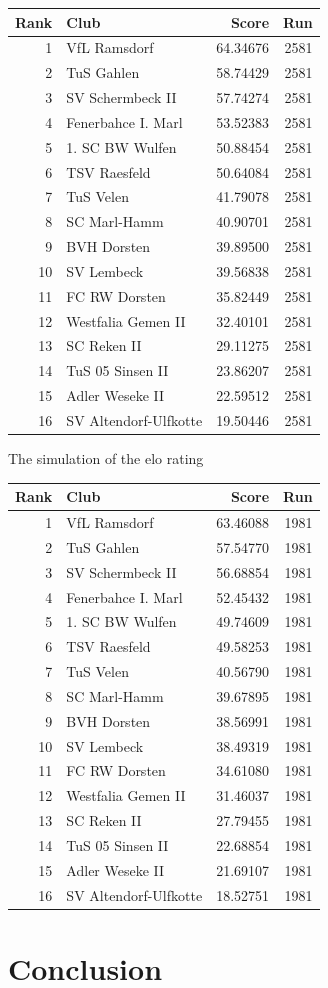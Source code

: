 \documentclass[12pt,a4paper]{article}
\begin{document}
\begin{longtable}[]{@{}rlrr@{}}
\toprule
Rank & Club & Score & Run\tabularnewline
\midrule
\endhead
1 & VfL Ramsdorf & 64.34676 & 2581\tabularnewline
2 & TuS Gahlen & 58.74429 & 2581\tabularnewline
3 & SV Schermbeck II & 57.74274 & 2581\tabularnewline
4 & Fenerbahce I. Marl & 53.52383 & 2581\tabularnewline
5 & 1. SC BW Wulfen & 50.88454 & 2581\tabularnewline
6 & TSV Raesfeld & 50.64084 & 2581\tabularnewline
7 & TuS Velen & 41.79078 & 2581\tabularnewline
8 & SC Marl-Hamm & 40.90701 & 2581\tabularnewline
9 & BVH Dorsten & 39.89500 & 2581\tabularnewline
10 & SV Lembeck & 39.56838 & 2581\tabularnewline
11 & FC RW Dorsten & 35.82449 & 2581\tabularnewline
12 & Westfalia Gemen II & 32.40101 & 2581\tabularnewline
13 & SC Reken II & 29.11275 & 2581\tabularnewline
14 & TuS 05 Sinsen II & 23.86207 & 2581\tabularnewline
15 & Adler Weseke II & 22.59512 & 2581\tabularnewline
16 & SV Altendorf-Ulfkotte & 19.50446 & 2581\tabularnewline
\bottomrule
\end{longtable}

The simulation of the elo rating

\begin{longtable}[]{@{}rlrr@{}}
\toprule
Rank & Club & Score & Run\tabularnewline
\midrule
\endhead
1 & VfL Ramsdorf & 63.46088 & 1981\tabularnewline
2 & TuS Gahlen & 57.54770 & 1981\tabularnewline
3 & SV Schermbeck II & 56.68854 & 1981\tabularnewline
4 & Fenerbahce I. Marl & 52.45432 & 1981\tabularnewline
5 & 1. SC BW Wulfen & 49.74609 & 1981\tabularnewline
6 & TSV Raesfeld & 49.58253 & 1981\tabularnewline
7 & TuS Velen & 40.56790 & 1981\tabularnewline
8 & SC Marl-Hamm & 39.67895 & 1981\tabularnewline
9 & BVH Dorsten & 38.56991 & 1981\tabularnewline
10 & SV Lembeck & 38.49319 & 1981\tabularnewline
11 & FC RW Dorsten & 34.61080 & 1981\tabularnewline
12 & Westfalia Gemen II & 31.46037 & 1981\tabularnewline
13 & SC Reken II & 27.79455 & 1981\tabularnewline
14 & TuS 05 Sinsen II & 22.68854 & 1981\tabularnewline
15 & Adler Weseke II & 21.69107 & 1981\tabularnewline
16 & SV Altendorf-Ulfkotte & 18.52751 & 1981\tabularnewline
\bottomrule
\end{longtable}

\hypertarget{conclusion}{%
\section{Conclusion}\label{conclusion}}

\newpage

\printbibliography
\end{document}
